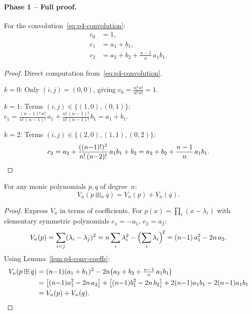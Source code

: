 \paragraph{Phase 1 -- Full proof.}

\begin{lemma}
\label{lem:p4-conv-coeffs}
For the convolution~\eqref{eq:p4-convolution}:
\begin{align}
  c_0 &= 1, \label{eq:p4-c0} \\
  c_1 &= a_1 + b_1, \label{eq:p4-c1} \\
  c_2 &= a_2 + b_2 + \tfrac{n-1}{n}\, a_1 b_1. \label{eq:p4-c2}
\end{align}
\end{lemma}

\begin{proof}
Direct computation from~\eqref{eq:p4-convolution}.

$k = 0$: Only $(i,j) = (0,0)$, giving $c_0 = \frac{n!\, n!}{n!\, n!} = 1$.

$k = 1$: Terms $(i,j) \in \{(1,0), (0,1)\}$:
$c_1 = \frac{(n{-}1)!\, n!}{n!\,(n{-}1)!}\, a_1 + \frac{n!\,(n{-}1)!}{n!\,(n{-}1)!}\, b_1 = a_1 + b_1$.

$k = 2$: Terms $(i,j) \in \{(2,0), (1,1), (0,2)\}$:
\[
  c_2 = a_2 + \frac{((n{-}1)!)^2}{n!\,(n{-}2)!}\, a_1 b_1 + b_2
  = a_2 + b_2 + \frac{n-1}{n}\, a_1 b_1. \qedhere
\]
\end{proof}

\begin{theorem}[$V_n$-additivity]
\label{thm:p4-Vn-additive}
For any monic polynomials $p, q$ of degree~$n$:
\begin{equation}\label{eq:p4-Vn-add}
  V_n(p \boxplus_n q) = V_n(p) + V_n(q).
\end{equation}
\end{theorem}

\begin{proof}
Express $V_n$ in terms of coefficients. For $p(x) = \prod_i(x - \lambda_i)$
with elementary symmetric polynomials $e_1 = -a_1$, $e_2 = a_2$:
\begin{equation}\label{eq:p4-Vn-formula}
  V_n(p) = \sum_{i<j}(\lambda_i - \lambda_j)^2
  = n\sum_i \lambda_i^2 - \Bigl(\sum_i \lambda_i\Bigr)^{\!2}
  = (n{-}1)\, a_1^2 - 2n\, a_2.
\end{equation}
Using Lemma~\ref{lem:p4-conv-coeffs}:
\begin{align*}
V_n(p \boxplus q)
&= (n{-}1)(a_1 + b_1)^2 - 2n\bigl(a_2 + b_2 + \tfrac{n-1}{n}\, a_1 b_1\bigr) \\
&= \bigl[(n{-}1) a_1^2 - 2n\, a_2\bigr] + \bigl[(n{-}1) b_1^2 - 2n\, b_2\bigr]
   + 2(n{-}1) a_1 b_1 - 2(n{-}1) a_1 b_1 \\
&= V_n(p) + V_n(q). \qedhere
\end{align*}
\end{proof}

